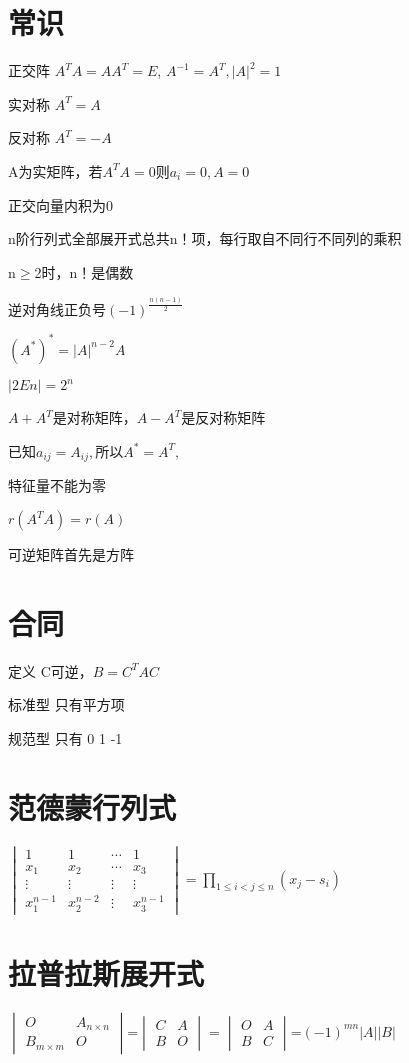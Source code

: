 \documentclass[UTF8]{ctexart}
\begin{document}
\section{常识}

正交阵 $A^{T}A=AA^{T}=E$, $A^{-1}=A^{T} , |A|^2 =1$


实对称 $A^{T}=A$

反对称 $A^{T}=-A$

A为实矩阵，若$A^{T}A=0\text{则}$$a_{i}=0,A=0$

正交向量内积为0

n阶行列式全部展开式总共n！项，每行取自不同行不同列的乘积

n$\geq$2时，n！是偶数

逆对角线正负号$(-1)^{\frac{n(n-1)}{2}}$

$(A^{*})^{*}=|A|^{n-2}A$


$|2En|=2^n$  


$A+A^{T}$是对称矩阵，$A-A^{T}$是反对称矩阵

已知$a_{ij}=A_{ij} , \mbox{所以} A^* =A^T ,$

特征量不能为零

$r(A^TA)=r(A)$

可逆矩阵首先是方阵


\section{合同}

定义 C可逆，$B=C^{T}AC$

标准型 只有平方项

规范型 只有 0 1 -1 

\section{范德蒙行列式}

$\begin{vmatrix}1 & 1 & \cdots & 1\\
x_{1} & x_{2} & \cdots & x_{3}\\
\vdots & \vdots & \vdots & \vdots\\
x_{1}^{n-1} & x_{2}^{n-2} & \vdots & x_{3}^{n-1}
\end{vmatrix}=\prod_{1\leq i<j\leq n}(x_{j}-s_{i})$

\section{拉普拉斯展开式}

$\begin{vmatrix}O & A_{n\times n}\\
B_{m\times m} & O
\end{vmatrix}$=$\begin{vmatrix}C & A\\
B & O
\end{vmatrix}=\begin{vmatrix}O & A\\
B & C
\end{vmatrix}$=$(-1)^{mn}|A||B|$
\end{document}

